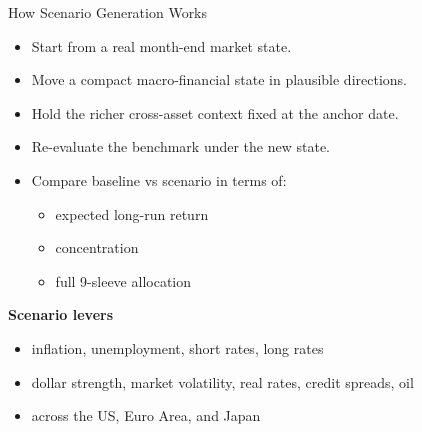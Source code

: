\documentclass[aspectratio=169,11pt]{beamer}
\begin{document}
\begin{frame}{How Scenario Generation Works}
\begin{itemize}
  \item Start from a real month-end market state.
  \item Move a compact macro-financial state in plausible directions.
  \item Hold the richer cross-asset context fixed at the anchor date.
  \item Re-evaluate the benchmark under the new state.
  \item Compare baseline vs scenario in terms of:
  \begin{itemize}
    \item expected long-run return
    \item concentration
    \item full 9-sleeve allocation
  \end{itemize}
\end{itemize}
\vspace{0.7em}
\textbf{Scenario levers}
\begin{itemize}
  \item inflation, unemployment, short rates, long rates
  \item dollar strength, market volatility, real rates, credit spreads, oil
  \item across the US, Euro Area, and Japan
\end{itemize}
\end{frame}
\end{document}
